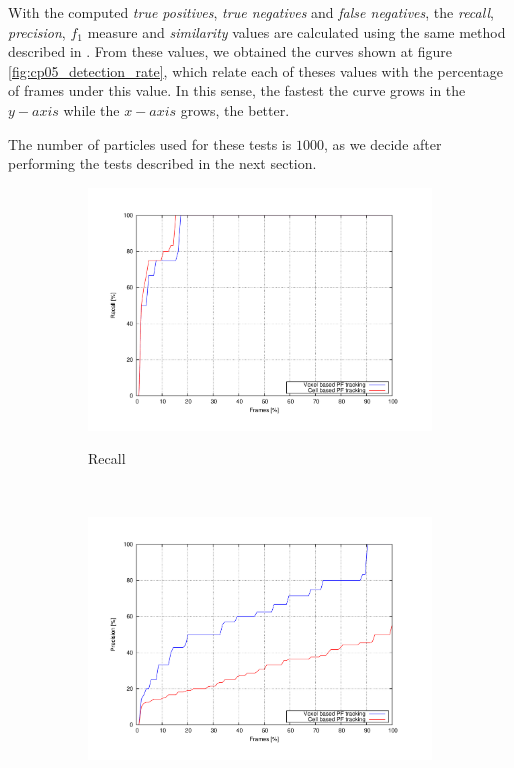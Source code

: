 With the computed \emph{true positives}, \emph{true negatives} and \emph{false negatives}, the \emph{recall}, \emph{precision}, \emph{$f_1$} measure and \emph{similarity} values are calculated using the same method described in . From these values, we obtained the curves shown at figure \ref{fig:cp05_detection_rate}, which relate each of theses values with the percentage of frames under this value. In this sense, the fastest the curve grows in the $y-axis$ while the $x-axis$ grows, the better.

The number of particles used for these tests is $1000$, as we decide after performing the tests described in the next section.

\begin{figure}[th]
        \centering
        \begin{subfigure}[b]{0.5\textwidth}
                \centering
                \includegraphics[width=\textwidth, trim=50 40 80 60,clip]{recall}\label{fig:cp05_recall}
                \caption{Recall}
                \label{fig:recallChart}
        \end{subfigure}%
        ~ %
        \begin{subfigure}[b]{0.5\textwidth}
                \centering
                \includegraphics[width=\textwidth, trim=50 40 80 60,clip]{precision}\label{fig:cp05_precision}

\end{subfigure}
\end{figure}
